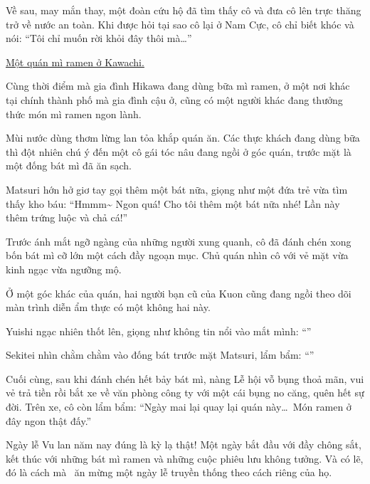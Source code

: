 \documentclass[../main.tex]{subfiles}
\begin{document}
Về sau, may mắn thay, một đoàn cứu hộ đã tìm thấy cô và đưa cô lên trực thăng trở về nước an toàn. Khi được hỏi tại sao cô lại ở Nam Cực, cô chỉ biết khóc và nói: ``Tôi chỉ muốn rời khỏi đây thôi mà\dots''

\begin{center}
  \uline{Một quán mì ramen ở Kawachi.}
\end{center}

Cùng thời điểm mà gia đình Hikawa đang dùng bữa mì ramen, ở một nơi khác tại chính thành phố mà gia đình cậu ở, cũng có một người khác đang thưởng thức món mì ramen ngon lành.

Mùi nước dùng thơm lừng lan tỏa khắp quán ăn. Các thực khách đang dùng bữa thì đột nhiên chú ý đến một cô gái tóc nâu đang ngồi ở góc quán, trước mặt là một đống bát mì đã ăn sạch.

Matsuri hớn hở giơ tay gọi thêm một bát nữa, giọng như một đứa trẻ vừa tìm thấy kho báu: ``Hmmm\~{} Ngon quá! Cho tôi thêm một bát nữa nhé! Lần này thêm trứng luộc và chả cá!''

Trước ánh mắt ngỡ ngàng của những người xung quanh, cô đã đánh chén xong bốn bát mì cỡ lớn một cách đầy ngoạn mục. Chủ quán nhìn cô với vẻ mặt vừa kinh ngạc vừa ngưỡng mộ.

Ở một góc khác của quán, hai người bạn cũ của Kuon cũng đang ngồi theo dõi màn trình diễn ẩm thực có một không hai này.

Yuishi ngạc nhiên thốt lên, giọng như không tin nổi vào mắt mình: ``''

Sekitei nhìn chằm chằm vào đống bát trước mặt Matsuri, lẩm bẩm: ``''

Cuối cùng, sau khi đánh chén hết bảy bát mì, nàng Lễ hội vỗ bụng thoả mãn, vui vẻ trả tiền rồi bắt xe về văn phòng công ty với một cái bụng no căng, quên hết sự đời. Trên xe, cô còn lẩm bẩm: ``Ngày mai lại quay lại quán này\dots\ Món ramen ở đây ngon thật đấy.''

\il

Ngày lễ Vu lan năm nay đúng là kỳ lạ thật! Một ngày bắt đầu với đầy chông sắt, kết thúc với những bát mì ramen và những cuộc phiêu lưu không tưởng. Và có lẽ, đó là cách mà \hll\ ăn mừng một ngày lễ truyền thống theo cách riêng của họ.
\end{document}
